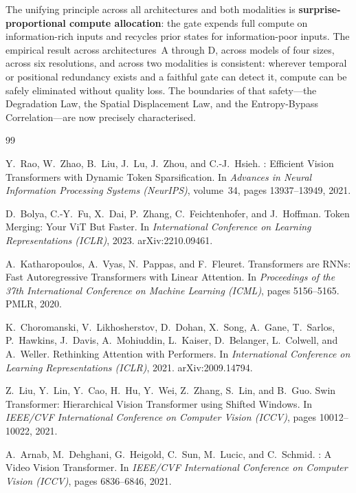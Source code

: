 \documentclass{article}
\begin{document}
The unifying principle across all architectures and both modalities is
\textbf{surprise-proportional compute allocation}: the gate expends full
compute on information-rich inputs and recycles prior states for
information-poor inputs. The empirical result across architectures~A through
D, across models of four sizes, across six resolutions, and across two
modalities is consistent: wherever temporal or positional redundancy exists
and a faithful gate can detect it, compute can be safely eliminated without
quality loss. The boundaries of that safety---the Degradation Law, the
Spatial Displacement Law, and the Entropy-Bypass
Correlation---are now precisely characterised.



\begin{thebibliography}{99}

Y.~Rao, W.~Zhao, B.~Liu, J.~Lu, J.~Zhou, and C.-J.~Hsieh.
: Efficient Vision Transformers with Dynamic Token Sparsification.
\newblock In \emph{Advances in Neural Information Processing Systems (NeurIPS)}, volume~34, pages 13937--13949, 2021.

D.~Bolya, C.-Y.~Fu, X.~Dai, P.~Zhang, C.~Feichtenhofer, and J.~Hoffman.
\newblock Token Merging: Your {ViT} But Faster.
\newblock In \emph{International Conference on Learning Representations (ICLR)}, 2023.
\newblock arXiv:2210.09461.

A.~Katharopoulos, A.~Vyas, N.~Pappas, and F.~Fleuret.
\newblock Transformers are {RNNs}: Fast Autoregressive Transformers with Linear Attention.
\newblock In \emph{Proceedings of the 37th International Conference on Machine Learning (ICML)}, pages 5156--5165. PMLR, 2020.

K.~Choromanski, V.~Likhosherstov, D.~Dohan, X.~Song, A.~Gane, T.~Sarlos, P.~Hawkins, J.~Davis, A.~Mohiuddin, L.~Kaiser, D.~Belanger, L.~Colwell, and A.~Weller.
\newblock Rethinking Attention with Performers.
\newblock In \emph{International Conference on Learning Representations (ICLR)}, 2021.
\newblock arXiv:2009.14794.

Z.~Liu, Y.~Lin, Y.~Cao, H.~Hu, Y.~Wei, Z.~Zhang, S.~Lin, and B.~Guo.
\newblock Swin Transformer: Hierarchical Vision Transformer using Shifted Windows.
\newblock In \emph{IEEE/CVF International Conference on Computer Vision (ICCV)}, pages 10012--10022, 2021.

A.~Arnab, M.~Dehghani, G.~Heigold, C.~Sun, M.~Lucic, and C.~Schmid.
: A Video Vision Transformer.
\newblock In \emph{IEEE/CVF International Conference on Computer Vision (ICCV)}, pages 6836--6846, 2021.


\end{thebibliography}
\end{document}
